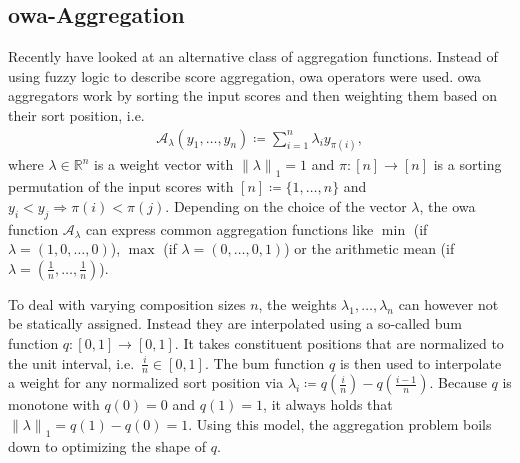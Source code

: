 \subsection{\acs*{owa}-Aggregation}%
\label{sec:related:lta:owa}

Recently \citet{Melnikov2019} have looked at an alternative class of aggregation functions.
Instead of using fuzzy logic to describe score aggregation, \ac{owa} operators were used.
\ac{owa} aggregators work by sorting the input scores and then weighting them based on their sort position, i.e.\ %
\begin{align}
	\mathcal{A}_{\lambda}(y_1, \dots, y_n) \coloneqq \sum_{i = 1}^n \lambda_i y_{\pi(i)},
\end{align}
where $\lambda \in \mathbb{R}^n$ is a weight vector with ${\|\lambda\|}_1 = 1$ and $\pi: [n] \to [n]$ is a sorting permutation of the input scores with $[n] \coloneqq \{ 1, \dots, n \}$ and $y_i < y_j \Rightarrow \pi(i) < \pi(j)$. %
Depending on the choice of the vector $\lambda$, the \ac{owa} function $\mathcal{A}_\lambda$ can express common aggregation functions like
$\min$ (if $\lambda = (1, 0, \dots, 0)$),
$\max$ (if $\lambda = (0, \dots, 0, 1)$)
or the arithmetic mean (if $\lambda = \left(\frac{1}{n}, \dots, \frac{1}{n}\right)$).

To deal with varying composition sizes $n$, the weights $\lambda_1, \dots, \lambda_n$ can however not be statically assigned.
Instead they are interpolated using a so-called \ac{bum} function $q: [0, 1] \to [0, 1]$.
It takes constituent positions that are normalized to the unit interval, i.e.\ $\frac{i}{n} \in [0, 1]$.
The \ac{bum} function $q$ is then used to interpolate a weight for any normalized sort position via $\lambda_i \coloneqq q\left(\frac{i}{n}\right) - q\left(\frac{i - 1}{n}\right)$.
Because $q$ is monotone with $q(0) = 0$ and $q(1) = 1$, it always holds that ${\|\lambda\|}_1 = q(1) - q(0) = 1$. %
Using this model, the aggregation problem boils down to optimizing the shape of $q$.

